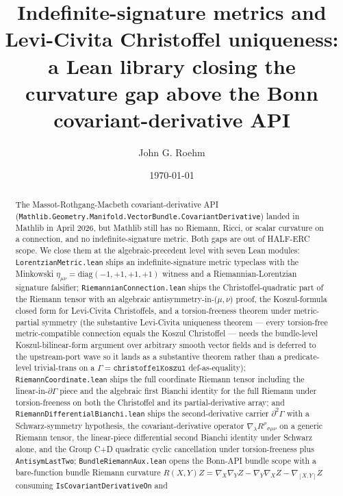 \documentclass[twocolumn]{revtex4-2}
\newcommand{\Mink}{\eta}
\begin{document}
\title{Indefinite-signature metrics and Levi-Civita Christoffel uniqueness:
  a Lean library closing the curvature gap above the Bonn covariant-derivative API}

\author{John G. Roehm}

\date{\today}

\begin{abstract}
The Massot-Rothgang-Macbeth covariant-derivative API
(\texttt{Mathlib.Geometry.Manifold.VectorBundle.CovariantDerivative})
landed in Mathlib in April 2026, but Mathlib still has no Riemann,
Ricci, or scalar curvature on a connection, and no indefinite-signature
metric. Both gaps are out of HALF-ERC scope. We close them at the
algebraic-precedent level with seven Lean modules:
\texttt{LorentzianMetric.lean} ships an indefinite-signature metric
typeclass with the Minkowski $\Mink_{\mu\nu} = \mathrm{diag}(-1,+1,+1,+1)$
witness and a Riemannian-Lorentzian signature falsifier;
\texttt{RiemannianConnection.lean} ships the Christoffel-quadratic
part of the Riemann tensor with an algebraic antisymmetry-in-($\mu,\nu$)
proof, the Koszul-formula closed form for Levi-Civita Christoffels, and
a torsion-freeness theorem under metric-partial symmetry (the substantive
Levi-Civita uniqueness theorem — every torsion-free metric-compatible
connection equals the Koszul Christoffel — needs the bundle-level
Koszul-bilinear-form argument over arbitrary smooth vector fields and is
deferred to the upstream-port wave so it lands as a substantive theorem
rather than a predicate-level trivial-trans on a $\Gamma = \texttt{christoffelKoszul}$
def-as-equality);
\texttt{RiemannCoordinate.lean} ships the full coordinate Riemann tensor
including the linear-in-$\partial \Gamma$ piece and the algebraic
first Bianchi identity for the full Riemann under torsion-freeness on
both the Christoffel and its partial-derivative array; and
\texttt{RiemannDifferentialBianchi.lean} ships the second-derivative
carrier $\partial^{2} \Gamma$ with a Schwarz-symmetry hypothesis, the
covariant-derivative operator $\nabla_\lambda R^\rho{}_{\sigma\mu\nu}$
on a generic Riemann tensor, the linear-piece differential second
Bianchi identity under Schwarz alone, and the Group C+D quadratic
cyclic cancellation under torsion-freeness plus
\texttt{AntisymLastTwo}; \texttt{BundleRiemannAux.lean} opens the
Bonn-API bundle scope with a bare-function bundle Riemann curvature
$R(X, Y)Z = \nabla_{X}\nabla_{Y}Z - \nabla_{Y}\nabla_{X}Z -
\nabla_{[X,Y]}Z$ consuming \texttt{IsCovariantDerivativeOn} and

\end{abstract}
\end{document}
